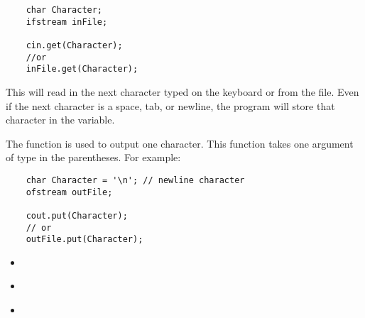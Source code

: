 \begin{lstlisting}
	char Character;
	ifstream inFile;

	cin.get(Character);
	//or
	inFile.get(Character);
\end{lstlisting}

This will read in the next character typed on the keyboard or from the file. 
Even if the next character is a space, tab, or newline, the program will store that character in the variable. 

The  function is used to output one character. 
This function takes one argument of type  in the parentheses. 
For example:

\begin{lstlisting}
	char Character = '\n'; // newline character
	ofstream outFile;

	cout.put(Character);
	// or
	outFile.put(Character);
\end{lstlisting}






\begin{itemize}
\item ~
\item ~
\item ~
\end{itemize}	

